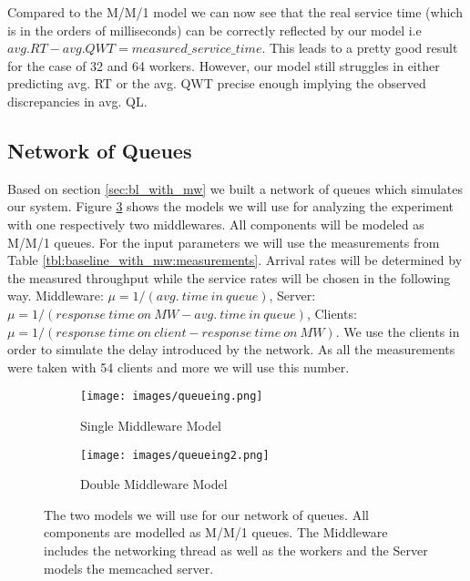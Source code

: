 \documentclass[11pt,a4paper]{article}
\begin{document}
Compared to the M/M/1 model we can now see that the real service time (which is in the orders of milliseconds) can be correctly reflected by our model i.e $avg.RT - avg.QWT = measured\_service\_time$. This leads to a pretty good result for the case of 32 and 64 workers. However, our model still struggles in either predicting avg. RT or the avg. QWT precise enough implying the observed discrepancies in avg. QL. 


\subsection{Network of Queues}

Based on section \ref{sec:bl_with_mw} we built a network of queues which simulates our system. Figure \ref{fig:queueing_models} shows the models we will use for analyzing the experiment with one respectively two middlewares. All components will be modeled as M/M/1 queues. For the input parameters we will use the measurements from Table \ref{tbl:baseline_with_mw:measurements}. Arrival rates will be determined by the measured throughput while the service rates will be chosen in the following way. Middleware: $\mu = 1/(avg.\ time\ in\ queue)$, Server: $\mu = 1/(response\ time\ on\ MW - avg.\ time\ in\ queue)$, Clients: $\mu = 1/(response\ time\ on\ client - response\ time\ on\ MW)$. We use the clients in order to simulate the delay introduced by the network. As all the measurements were taken with 54 clients and more we will use this number.  

\begin{figure}
\centering
\begin{subfigure}{.5\textwidth}
    \centering
    \texttt{[image: images/queueing.png]}
    \caption{Single Middleware Model}
    \label{plt:queueing_single_mw}
\end{subfigure}%
\begin{subfigure}{.5\textwidth}
    \centering
    \texttt{[image: images/queueing2.png]}
    \caption{Double Middleware Model}
    \label{plt:queuing_two_mw}
\end{subfigure}
\caption{The two models we will use for our network of queues. All components are modelled as M/M/1 queues. The Middleware includes the networking thread as well as the workers and the Server models the memcached server.}
\label{fig:queueing_models}
\end{figure}
\end{document}
